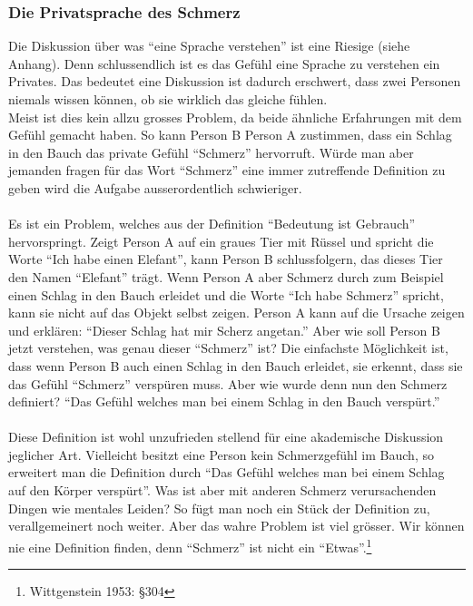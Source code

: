 \documentclass[10pt,a4paper]{article}
\begin{document}
\subsubsection{Die Privatsprache des Schmerz}
Die Diskussion über was \enquote{eine Sprache verstehen} ist eine Riesige (siehe Anhang).
Denn schlussendlich ist es das Gefühl eine Sprache zu verstehen ein Privates. Das bedeutet eine Diskussion ist dadurch erschwert, dass zwei Personen niemals wissen können, ob sie wirklich das gleiche fühlen. \\
Meist ist dies kein allzu grosses Problem, da beide ähnliche Erfahrungen mit dem Gefühl gemacht haben. So kann Person B Person A zustimmen, dass ein Schlag in den Bauch das private Gefühl \enquote{Schmerz} hervorruft. Würde man aber jemanden fragen für das Wort \enquote{Schmerz} eine immer zutreffende Definition zu geben wird die Aufgabe ausserordentlich schwieriger. \\
\\
Es ist ein Problem, welches aus der Definition \enquote{Bedeutung ist Gebrauch} hervorspringt. Zeigt Person A auf ein graues Tier mit Rüssel und spricht die Worte \enquote{Ich habe einen Elefant}, kann Person B schlussfolgern, das dieses Tier den Namen \enquote{Elefant} trägt. Wenn Person A aber Schmerz durch zum Beispiel einen Schlag in den Bauch erleidet und die Worte \enquote{Ich habe Schmerz} spricht, kann sie nicht auf das Objekt selbst zeigen. Person A kann auf die Ursache zeigen und erklären: \enquote{Dieser Schlag hat mir Scherz angetan.} Aber wie soll Person B jetzt verstehen, was genau dieser \enquote{Schmerz} ist? Die einfachste Möglichkeit ist, dass wenn Person B auch einen Schlag in den Bauch erleidet, sie erkennt, dass sie das Gefühl \enquote{Schmerz} verspüren muss. Aber wie wurde denn nun den Schmerz definiert? \enquote{Das Gefühl welches man bei einem Schlag in den Bauch verspürt.} \\
\\
Diese Definition ist wohl unzufrieden stellend für eine akademische Diskussion jeglicher Art. Vielleicht besitzt eine Person kein Schmerzgefühl im Bauch, so erweitert man die Definition durch \enquote{Das Gefühl welches man bei einem Schlag auf den Körper verspürt}. Was ist aber mit anderen Schmerz verursachenden Dingen wie mentales Leiden? So fügt man noch ein Stück der Definition zu, verallgemeinert noch weiter. Aber das wahre Problem ist viel grösser. Wir können nie eine Definition finden, denn \enquote{Schmerz} ist nicht ein \enquote{Etwas}.\footnote{Wittgenstein 1953: §304}
\end{document}
